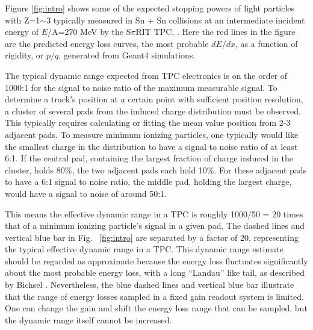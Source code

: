 \documentclass[review]{elsarticle}
\begin{document}
Figure \ref{fig:intro} shows some of the expected stopping powers of light particles with Z=1$\sim$3 typically measured in Sn + Sn collisions at an intermediate incident energy of $E$/A=270 MeV by the S$\pi$RIT TPC, \cite{shane}. Here the red lines in the figure are the predicted energy loss curves, the most probable $dE/dx$, as a function of rigidity, or $p/q$, generated from Geant4 \cite{genfit} simulations. 

The typical dynamic range expected from TPC electronics is on the order of 1000:1 for the signal to noise ratio of the maximum measurable signal. To determine a track's position at a certain point with sufficient position resolution, a cluster of several pads from the induced charge distribution must be observed. This typically requires calculating or fitting the mean value position from 2-3 adjacent pads. To measure minimum ionizing particles, one typically would like the smallest charge in the distribution to have a signal to noise ratio of at least 6:1. If the central pad, containing the largest fraction of charge induced in the cluster, holds 80\%, the two adjacent pads each hold 10\%. For these adjacent pads to have a 6:1 signal to noise ratio, the middle pad, holding the largest charge, would have a signal to noise of around 50:1. 

 This means the effective dynamic range in a TPC is roughly 1000/50 = 20 times that of a minimum ionizing particle's signal in a given pad. The dashed lines and vertical blue bar in Fig.~ \ref{fig:intro} are separated by a factor of 20, representing the typical effective dynamic range in a TPC. This dynamic range estimate should be regarded as approximate because the energy loss fluctuates significantly about the most probable energy loss, with a long ``Landau'' like tail, as described by Bichsel \cite{bichsel}. Nevertheless, the blue dashed lines and vertical blue bar illustrate that the range of energy losses sampled in a fixed gain readout system is limited. One can change the gain and shift the energy loss range that can be sampled, but the dynamic range itself cannot be increased.
\end{document}
